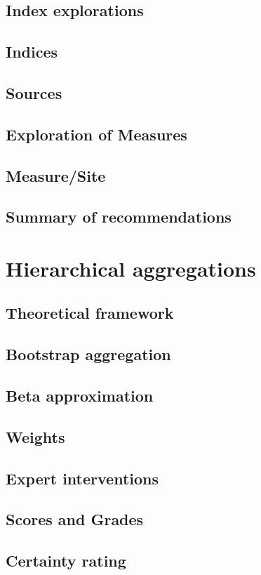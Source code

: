 \documentclass[a4paper,8pt]{AIMSreport}
\begin{document}
\subsection{Index explorations}
\subsection{Indices}

\subsection{Sources}
\subsection{Exploration of Measures}
\subsection{Measure/Site}
\subsection{Summary of recommendations}

\section{Hierarchical aggregations}
\subsection{Theoretical framework}
\subsection{Bootstrap aggregation}                   
\subsection{Beta approximation}
\subsection{Weights}           
\subsection{Expert interventions}
\subsection{Scores and Grades}
\subsection{Certainty rating}
\end{document}
